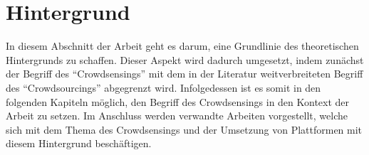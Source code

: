 \chapter{Hintergrund} %
In diesem Abschnitt der Arbeit geht es darum, eine Grundlinie des theoretischen Hintergrunds zu schaffen. Dieser Aspekt wird dadurch umgesetzt, indem zunächst der Begriff des \enquote{Crowdsensings} mit dem in der Literatur weitverbreiteten Begriff des \enquote{Crowdsourcings} abgegrenzt wird. Infolgedessen ist es somit in den folgenden Kapiteln möglich, den Begriff des Crowdsensings in den Kontext der Arbeit zu setzen. Im Anschluss werden verwandte Arbeiten vorgestellt, welche sich mit dem Thema des Crowdsensings und der Umsetzung von Plattformen mit diesem 
Hintergrund beschäftigen.

